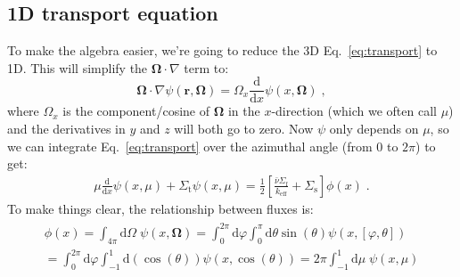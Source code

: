 \documentclass{article}
\begin{document}
\subsection{1D transport equation}
To make the algebra easier, we're going to reduce the 3D Eq.~\eqref{eq:transport} to 1D. This will simplify the $\mathbf{\Omega}\cdot\nabla$ term to:
\begin{equation}
    \mathbf{\Omega}\cdot\nabla\psi(\mathbf{r},\mathbf{\Omega}) = \Omega_x \frac{\mathrm{d}}{\mathrm{d}x}\psi(x,\mathbf{\Omega})\;\mathrm{,}
\end{equation}
where $\Omega_x$ is the component/cosine of $\mathbf{\Omega}$ in the $x$-direction (which we often call $\mu$) and the derivatives in $y$ and $z$ will both go to zero. Now $\psi$ only depends on $\mu$, so we can integrate Eq.~\eqref{eq:transport} over the azimuthal angle (from 0 to $2\pi$) to get:
\begin{equation}\label{eq:transport_1D}
    \begin{split}
 \mu\frac{\mathrm{d}}{\mathrm{d}x}\psi(x,\mu) + \Sigma_\mathrm{t}\psi(x,\mu)
    =\frac{1}{2}\left[\frac{\bar{\nu}\Sigma_\mathrm{f}}{ k_\mathrm{eff}} + \Sigma_\mathrm{s}\right]\phi(x)\;\mathrm{.}
    \end{split}
\end{equation}
To make things clear, the relationship between fluxes is:
\begin{align}
\begin{split}
    \phi(x) = \int_{4\pi}\mathrm{d}\Omega\; \psi(x,\mathbf{\Omega}) = \int^{2\pi}_0 \mathrm{d}\varphi\int^{\pi}_{0}\mathrm{d}\theta\sin(\theta)\psi(x,[\varphi,\theta]) \\
    =\int^{2\pi}_0 \mathrm{d}\varphi\int^{1}_{-1}\mathrm{d}\left(\cos(\theta)\right)\psi(x,\cos(\theta))=2\pi \int^1_{-1}\mathrm{d}\mu\; \psi(x,\mu)
\end{split}
\end{align}
\end{document}
